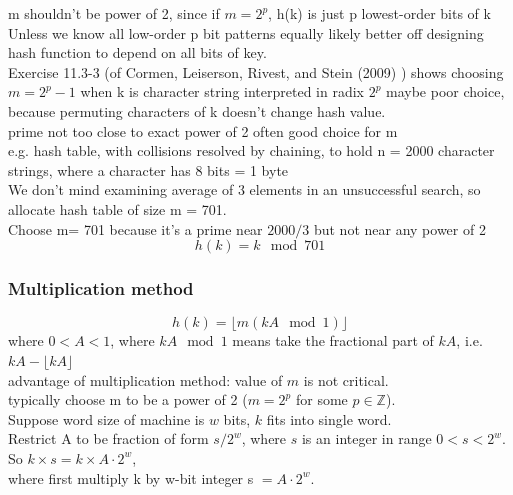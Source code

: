 \documentclass[10pt]{amsart}
\begin{document}
\begin{multicols*}{2}
m shouldn't be power of 2, since if $m=2^p$, h(k) is just p lowest-order bits of k \\
Unless we know all low-order p bit patterns equally likely better off designing hash function to depend on all bits of key. \\
Exercise 11.3-3 (of Cormen, Leiserson, Rivest, and Stein (2009) \cite{CLRS2009}) shows choosing $m=2^p - 1$ when k is character string interpreted in radix $2^p$ maybe poor choice, because permuting characters of k doesn't change hash value. \\

prime not too close to exact power of 2 often good choice for m \\
e.g. hash table, with collisions resolved by chaining, to hold n = 2000 character strings, where a character has 8 bits = 1 byte \\
We don't mind examining average of 3 elements in an unsuccessful search, so allocate hash table of size m = 701.  \\
Choose m= 701 because it's a prime near $2000/3$ but not near any power of 2
\begin{equation}
h(k) = k \mod{701}
\end{equation}

\subsubsection{Multiplication method}

\[
h(k) = \lfloor m (kA \mod{1}) \rfloor
\]
where $0 < A < 1$, where $kA \mod{1}$ means take the fractional part of $kA$, i.e. $kA - \lfloor kA \rfloor$ \\

advantage of multiplication method: value of $m$ is not critical. \\
typically choose m to be a power of 2 ($m = 2^p$ for some $p \in \mathbb{Z}$). \\

Suppose word size of machine is $w$ bits, $k$ fits into single word. \\

Restrict A to be fraction of form $s/2^w$, where $s$ is an integer in range $0 < s < 2^w$.  \\

So $k \times s = k \times A \cdot 2^w$, \\
where first multiply k by w-bit integer s $= A \cdot 2^w$.  \\


\end{multicols*}
\end{document}
